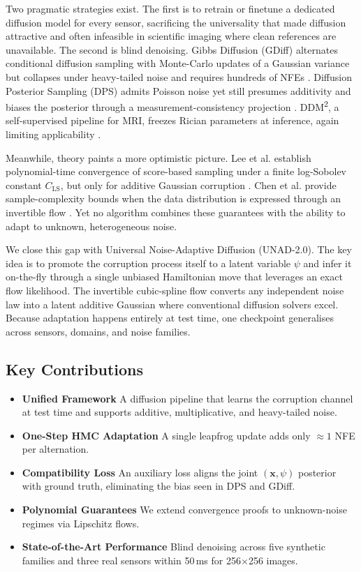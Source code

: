 \documentclass{article} %
\begin{document}
Two pragmatic strategies exist. The first is to retrain or finetune a dedicated diffusion model for every sensor, sacrificing the universality that made diffusion attractive and often infeasible in scientific imaging where clean references are unavailable. The second is blind denoising. Gibbs Diffusion (GDiff) alternates conditional diffusion sampling with Monte-Carlo updates of a Gaussian variance but collapses under heavy-tailed noise and requires hundreds of NFEs \cite{heurteldepeiges_2024_listening}. Diffusion Posterior Sampling (DPS) admits Poisson noise yet still presumes additivity and biases the posterior through a measurement-consistency projection \cite{chung_2022_diffusion}. DDM\textsuperscript{2}, a self-supervised pipeline for MRI, freezes Rician parameters at inference, again limiting applicability \cite{xiang_2023_ddm}.

Meanwhile, theory paints a more optimistic picture. Lee et al. establish polynomial-time convergence of score-based sampling under a finite log-Sobolev constant \(C_{\mathrm{LS}}\), but only for additive Gaussian corruption \cite{lee_2022_convergence}. Chen et al. provide sample-complexity bounds when the data distribution is expressed through an invertible flow \cite{chen_2023_score}. Yet no algorithm combines these guarantees with the ability to adapt to unknown, heterogeneous noise.

We close this gap with Universal Noise-Adaptive Diffusion (UNAD-2.0). The key idea is to promote the corruption process itself to a latent variable \(\psi\) and infer it on-the-fly through a single unbiased Hamiltonian move that leverages an exact flow likelihood. The invertible cubic-spline flow converts any independent noise law into a latent additive Gaussian where conventional diffusion solvers excel. Because adaptation happens entirely at test time, one checkpoint generalises across sensors, domains, and noise families.

\subsection{Key Contributions}
\begin{itemize}
  \item \textbf{Unified Framework} A diffusion pipeline that learns the corruption channel at test time and supports additive, multiplicative, and heavy-tailed noise.
  \item \textbf{One-Step HMC Adaptation} A single leapfrog update adds only \(\approx\!1\) NFE per alternation.
  \item \textbf{Compatibility Loss} An auxiliary loss aligns the joint \((\mathbf{x},\psi)\) posterior with ground truth, eliminating the bias seen in DPS and GDiff.
  \item \textbf{Polynomial Guarantees} We extend convergence proofs to unknown-noise regimes via Lipschitz flows.
  \item \textbf{State-of-the-Art Performance} Blind denoising across five synthetic families and three real sensors within 50\,ms for 256\(\times\)256 images.
\end{itemize}
\end{document}
